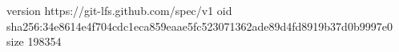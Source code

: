 version https://git-lfs.github.com/spec/v1
oid sha256:34e8614e4f704cdc1eca859eaae5fc523071362ade89d4fd8919b37d0b9997e0
size 198354
